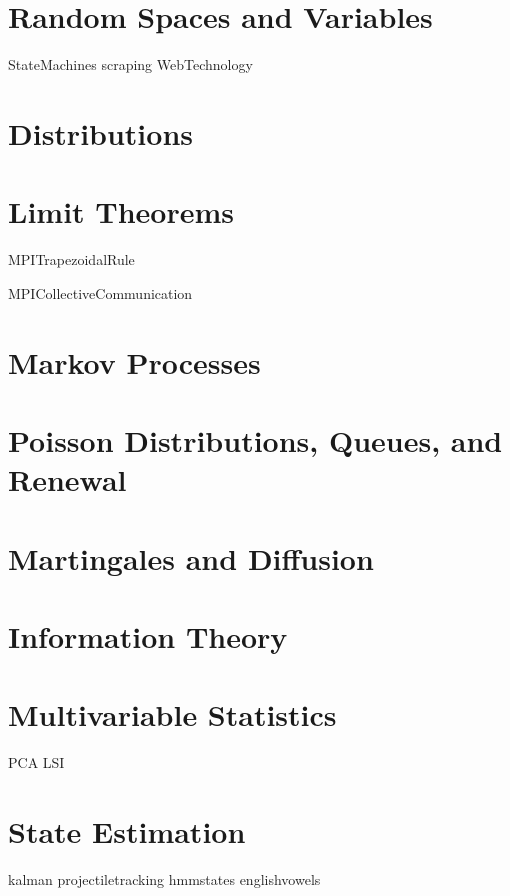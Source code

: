 \documentclass[nociteref]{SIAM-GH-book}
\begin{document}
\part{Random Spaces and Variables}

{StateMachines}
{scraping}
{WebTechnology}

\part{Distributions}

\part{Limit Theorems}



{MPITrapezoidalRule}




{MPICollectiveCommunication}


\part{Markov Processes}

\part{Poisson Distributions, Queues, and Renewal}

\part{Martingales and Diffusion}

\part{Information Theory}

\part{Multivariable Statistics}
{PCA}
{LSI}

\part{State Estimation}
{kalman}
{projectiletracking}
{hmmstates}
{englishvowels}
\end{document}
